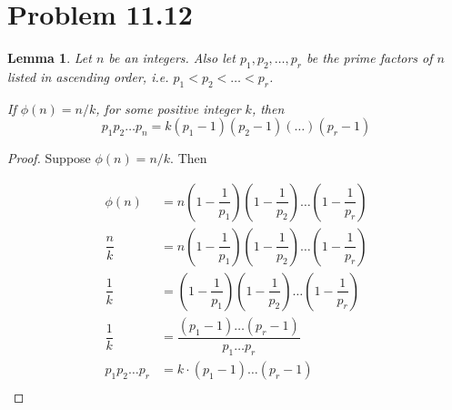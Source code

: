 \documentclass[letterpaper, 12pt, oneside]{memoir}
\theoremstyle{mystyle}
\newtheorem{lemma}[thm]{Lemma}
\begin{document}
\section{Problem 11.12} 

\begin{lemma}
    Let $n$ be an integers. Also let $p_1, p_2, \ldots, p_r$ be the prime
    factors of $n$ listed in ascending order, i.e. $p_1 < p_2 < \ldots < p_r$.
    
    If $\phi(n) = n/k$, for some positive integer $k$, then
    \[p_1 p_2 \ldots p_n = k(p_1 - 1)(p_2 - 1)(\ldots)(p_r - 1) \]
\end{lemma}
\begin{proof}
    Suppose $\phi(n) = n/k$. Then

    \begin{align*}
        \phi(n) &= n \left( 1 - \dfrac{1}{p_1} \right) \left( 1 - \dfrac{1}{p_2} \right) \dots \left( 1 - \dfrac{1}{p_r} \right) \\
        \dfrac{n}{k} &= n \left( 1 - \dfrac{1}{p_1} \right) \left( 1 - \dfrac{1}{p_2} \right) \dots \left( 1 - \dfrac{1}{p_r} \right) \\
        \dfrac{1}{k} &= \left( 1 - \dfrac{1}{p_1} \right) \left( 1 - \dfrac{1}{p_2} \right) \dots \left( 1 - \dfrac{1}{p_r} \right) \\
        \dfrac{1}{k} &= \dfrac{(p_1 - 1) \dots (p_r - 1)}{p_1 \dots p_r} \\
        p_1 p_2 \dots p_r &= k \cdot (p_1 - 1) \dots (p_r - 1) \\
    \end{align*}
\end{proof}
\end{document}
